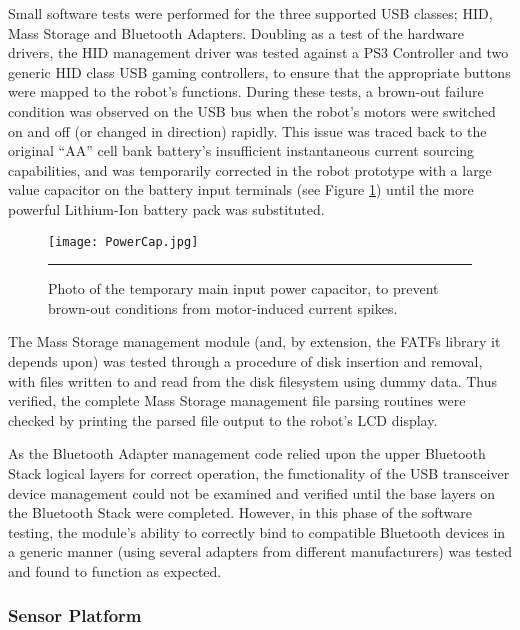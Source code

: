Small software tests were performed for the three supported USB classes; HID, Mass Storage and Bluetooth Adapters. Doubling as a test of the hardware drivers, the HID management driver was tested against a PS3 Controller and two generic HID class USB gaming controllers, to ensure that the appropriate buttons were mapped to the robot's functions. During these tests, a brown-out failure condition was observed on the USB bus when the robot's motors were switched on and off (or changed in direction) rapidly. This issue was traced back to the original ``AA'' cell bank battery's insufficient instantaneous current sourcing capabilities, and was temporarily corrected in the robot prototype with a large value capacitor on the battery input terminals (see Figure \ref{fig:mainpowercap}) until the more powerful Lithium-Ion battery pack was substituted.

\begin{figure}[tbph]
	\vspace{1em}
	\centering
		\texttt{[image: PowerCap.jpg]}
	\rule{35em}{0.5pt}
	\caption[Temporary Main Power Input Capacitor]{Photo of the temporary main input power capacitor, to prevent brown-out conditions from motor-induced current spikes.}
	\label{fig:mainpowercap}
\end{figure}

The Mass Storage management module (and, by extension, the FATFs library it depends upon) was tested through a procedure of disk insertion and removal, with files written to and read from the disk filesystem using dummy data. Thus verified, the complete Mass Storage management file parsing routines were checked by printing the parsed file output to the robot's LCD display.

As the Bluetooth Adapter management code relied upon the upper Bluetooth Stack logical layers for correct operation, the functionality of the USB transceiver device management could not be examined and verified until the base layers on the Bluetooth Stack were completed. However, in this phase of the software testing, the module's ability to correctly bind to compatible Bluetooth devices in a generic manner (using several adapters from different manufacturers) was tested and found to function as expected.

\FloatBarrier
\subsubsection{Sensor Platform}

